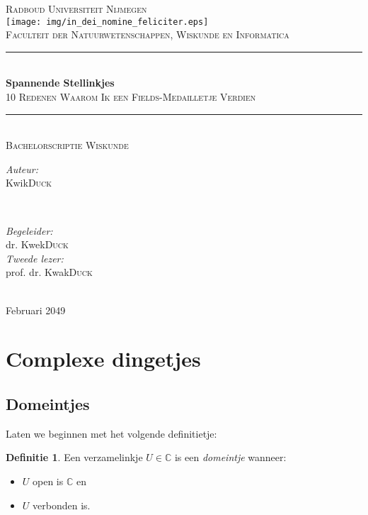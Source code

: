 \documentclass{article}
\title{\thesistitle}
\author{\thesisauthorfirst\space\thesisauthorsecond}
\date{\thesisdate}
\def\thesistitle{Spannende Stellinkjes}
\def\thesissubtitle{10 Redenen Waarom Ik een Fields-Medailletje Verdien}
\def\thesisauthorfirst{Kwik}
\def\thesisauthorsecond{Duck}
\def\thesissupervisorfirst{dr. Kwek}
\def\thesissupervisorsecond{Duck}
\def\thesissecondreaderfirst{prof. dr. Kwak}
\def\thesissecondreadersecond{Duck}
\def\thesisdate{Februari 2049}
\theoremstyle{definition}
\newtheorem{definition}[theorem]{Definitie}
\theoremstyle{remark}
\begin{document}
\begin{titlepage}
	\thispagestyle{empty}
	\newcommand{\HRule}{\rule{\linewidth}{0.5mm}}
	\center
	\textsc{\Large Radboud Universiteit Nijmegen}\\[.7cm]
	\texttt{[image: img/in\_dei\_nomine\_feliciter.eps]}\\[.5cm]
	\textsc{Faculteit der Natuurwetenschappen, Wiskunde en Informatica}\\[0.5cm]
	
	\HRule \\[0.4cm]
	{ \huge \bfseries \thesistitle}\\[0.1cm]
	\textsc{\thesissubtitle}\\
	\HRule \\[.5cm]
	\textsc{\large Bachelorscriptie Wiskunde}\\[.5cm]
	
	\begin{minipage}{0.4\textwidth}
	\begin{flushleft} \large
	\emph{Auteur:}\\
	\thesisauthorfirst\space \textsc{\thesisauthorsecond}
	\end{flushleft}
	\end{minipage}
	~
	\begin{minipage}{0.4\textwidth}
	\begin{flushright} \large
	\emph{Begeleider:} \\
	\thesissupervisorfirst\space \textsc{\thesissupervisorsecond} \\[1em]
	\emph{Tweede lezer:} \\
	\thesissecondreaderfirst\space \textsc{\thesissecondreadersecond}
	\end{flushright}
	\end{minipage}\\[4cm]
	\vfill
	{\large \thesisdate}\\
	\clearpage
\end{titlepage}

\tableofcontents

\newpage
\section{Complexe dingetjes}
\subsection{Domeintjes}
Laten we beginnen met het volgende definitietje:
\begin{definition}\label{def:domain}
Een verzamelinkje $U \in \mathbb{C}$ is een \emph{domeintje} wanneer:
\begin{itemize}
    \item $U$ open is $\mathbb{C}$ en
    \item $U$ verbonden is.
\end{itemize}
\end{definition}
\end{document}
